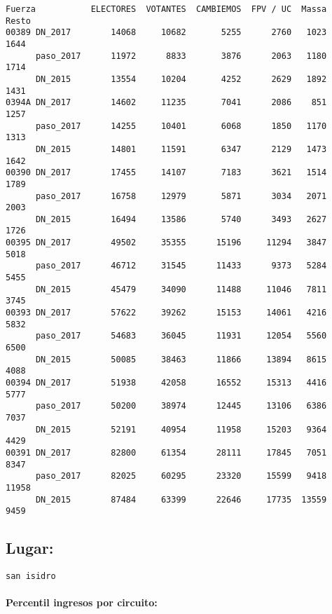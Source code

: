 \documentclass[11pt]{article}
\begin{document}
    \begin{verbatim}
Fuerza           ELECTORES  VOTANTES  CAMBIEMOS  FPV / UC  Massa  Resto
00389 DN_2017        14068     10682       5255      2760   1023   1644
      paso_2017      11972      8833       3876      2063   1180   1714
      DN_2015        13554     10204       4252      2629   1892   1431
0394A DN_2017        14602     11235       7041      2086    851   1257
      paso_2017      14255     10401       6068      1850   1170   1313
      DN_2015        14801     11591       6347      2129   1473   1642
00390 DN_2017        17455     14107       7183      3621   1514   1789
      paso_2017      16758     12979       5871      3034   2071   2003
      DN_2015        16494     13586       5740      3493   2627   1726
00395 DN_2017        49502     35355      15196     11294   3847   5018
      paso_2017      46712     31545      11433      9373   5284   5455
      DN_2015        45479     34090      11488     11046   7811   3745
00393 DN_2017        57622     39262      15153     14061   4216   5832
      paso_2017      54683     36045      11931     12054   5560   6500
      DN_2015        50085     38463      11866     13894   8615   4088
00394 DN_2017        51938     42058      16552     15313   4416   5777
      paso_2017      50200     38974      12445     13106   6386   7037
      DN_2015        52191     40954      11958     15203   9364   4429
00391 DN_2017        82800     61354      28111     17845   7051   8347
      paso_2017      82025     60295      23320     15599   9418  11958
      DN_2015        87484     63399      22646     17735  13559   9459
    \end{verbatim}

    
    \hypertarget{lugar}{%
\subsection{Lugar:}\label{lugar}}

    
    \begin{Verbatim}[commandchars=\\\{\}]
san isidro

    \end{Verbatim}

    \hypertarget{percentil-ingresos-por-circuito}{%
\paragraph{Percentil ingresos por
circuito:}\label{percentil-ingresos-por-circuito}}
\end{document}
